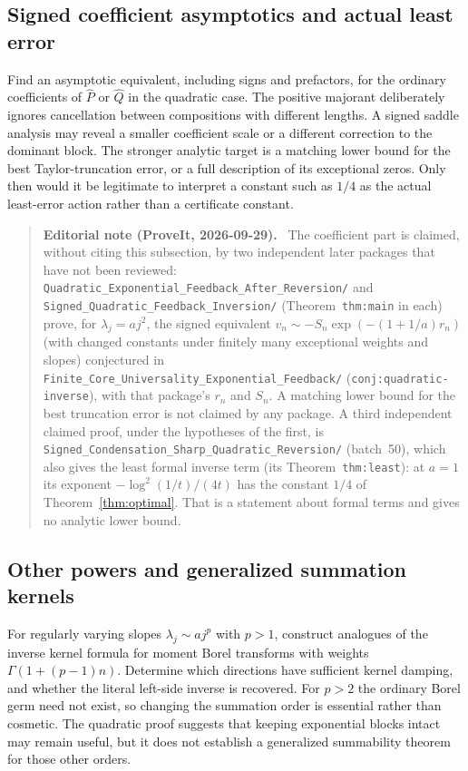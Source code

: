 \documentclass[11pt,a4paper]{article}
\numberwithin{equation}{section}
\theoremstyle{definition}
\theoremstyle{remark}
\newcommand{\Q}{\widehat Q}
\newcommand{\Pp}{\widehat P}
\newenvironment{ednote}{\par\smallskip\begin{quote}\small\raggedright\textbf{Editorial note (ProveIt, 2026-09-29).}\ }{\end{quote}\smallskip}
\begin{document}
\subsection{Signed coefficient asymptotics and actual least error}
Find an asymptotic equivalent, including signs and prefactors, for the
ordinary coefficients of $\Pp$ or $\Q$ in the quadratic case.  The
positive majorant deliberately ignores cancellation between compositions
with different lengths.  A signed saddle analysis may reveal a smaller
coefficient scale or a different correction to the dominant block.
The stronger analytic target is a matching lower bound for the best
Taylor-truncation error, or a full description of its exceptional zeros.
Only then would it be legitimate to interpret a constant such as $1/4$
as the actual least-error action rather than a certificate constant.
\begin{ednote}
The coefficient part is claimed, without citing this subsection, by two
independent later packages that have not been reviewed:
\nolinkurl{Quadratic_Exponential_Feedback_After_Reversion/} and
\nolinkurl{Signed_Quadratic_Feedback_Inversion/} (Theorem~\texttt{thm:main} in
each) prove, for $\lambda_j=aj^2$, the signed equivalent
$v_n\sim-S_n\exp(-(1+1/a)r_n)$ (with changed constants under finitely
many exceptional weights and slopes) conjectured in
\nolinkurl{Finite_Core_Universality_Exponential_Feedback/}
(\texttt{conj:quadratic-inverse}), with that package's $r_n$ and $S_n$. A matching
lower bound for the best truncation error is not claimed by any package.
A third independent claimed proof, under the hypotheses of the first, is
\nolinkurl{Signed_Condensation_Sharp_Quadratic_Reversion/} (batch~50), which
also gives the least formal inverse term (its Theorem~\texttt{thm:least}):
at $a=1$ its exponent $-\log^2(1/t)/(4t)$ has the constant $1/4$ of
Theorem~\ref{thm:optimal}. That is a statement about formal terms and gives
no analytic lower bound.
\end{ednote}

\subsection{Other powers and generalized summation kernels}
For regularly varying slopes $\lambda_j\sim a j^p$ with $p>1$, construct
analogues of the inverse kernel formula for moment Borel transforms with
weights $\Gamma(1+(p-1)n)$.  Determine which directions have sufficient
kernel damping, and whether the literal left-side inverse is recovered.
For $p>2$ the ordinary Borel germ need not exist, so changing the summation
order is essential rather than cosmetic.  The quadratic proof suggests
that keeping exponential blocks intact may remain useful, but it does
not establish a generalized summability theorem for those other orders.
\end{document}
